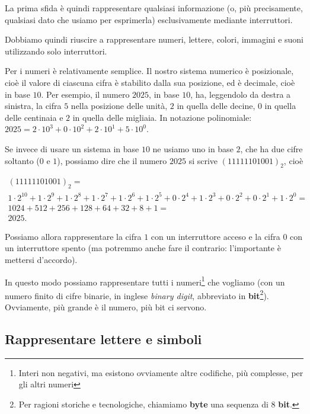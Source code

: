 La prima sfida è quindi rappresentare qualsiasi informazione (o, più precisamente, qualsiasi dato che usiamo per esprimerla) esclusivamente mediante interruttori.

Dobbiamo quindi riuscire a rappresentare numeri, lettere, colori, immagini e suoni utilizzando solo interruttori.

Per i numeri è relativamente semplice. Il nostro sistema numerico è posizionale, cioè il valore di ciascuna cifra è stabilito dalla sua posizione, ed è decimale, cioè in base \(10\). Per esempio, il numero \(2025\), in base \(10\), ha, leggendolo da destra a sinistra, la cifra \(5\) nella posizione delle unità, \(2\) in quella delle decine, \(0\) in quella delle centinaia e \(2\) in quella delle migliaia. In notazione polinomiale: $2025 = 2 \cdot 10^{3} + 0 \cdot 10^{2} + 2 \cdot 10^{1} + 5 \cdot 10^{0}$.


Se invece di usare un sistema in base \(10\) ne usiamo uno in base \(2\), che ha due cifre soltanto (\(0\) e \(1\)), possiamo dire che il numero $2025$ si scrive
$(11111101001)_2$,
cioè
\begin{center}
\setlength{\jot}{6pt}
\(\displaystyle
\begin{gathered}
  (11111101001)_2 = {}\\
  1\cdot2^{10} + 1\cdot2^{9} + 1\cdot2^{8} + 1\cdot2^{7} + 1\cdot2^{6} + 1\cdot2^{5} + 0\cdot2^{4} + 1\cdot2^{3} + 0\cdot2^{2} + 0\cdot2^{1} + 1\cdot2^{0} = {}\\
  1024 + 512 + 256 + 128 + 64 + 32 + 8 + 1 = {}\\
  2025.
\end{gathered}
\)
\end{center}

Possiamo allora rappresentare la cifra \(1\) con un interruttore acceso e la cifra \(0\) con un interruttore spento (ma potremmo anche fare il contrario: l'importante è mettersi d'accordo).

In questo modo possiamo rappresentare tutti i numeri\footnote{Interi non negativi, ma esistono ovviamente altre codifiche, più complesse, per gli altri numeri} che vogliamo (con un numero finito di cifre binarie, in inglese \emph{binary digit}, abbreviato in \textbf{bit}\footnote{Per ragioni storiche e tecnologiche, chiamiamo \textbf{byte} una sequenza di \(8\) \textbf{bit}.}). Ovviamente, più grande è il numero, più bit ci servono.

\subsection{Rappresentare lettere e simboli }\label{rappresentare-lettere-e-simboli}

